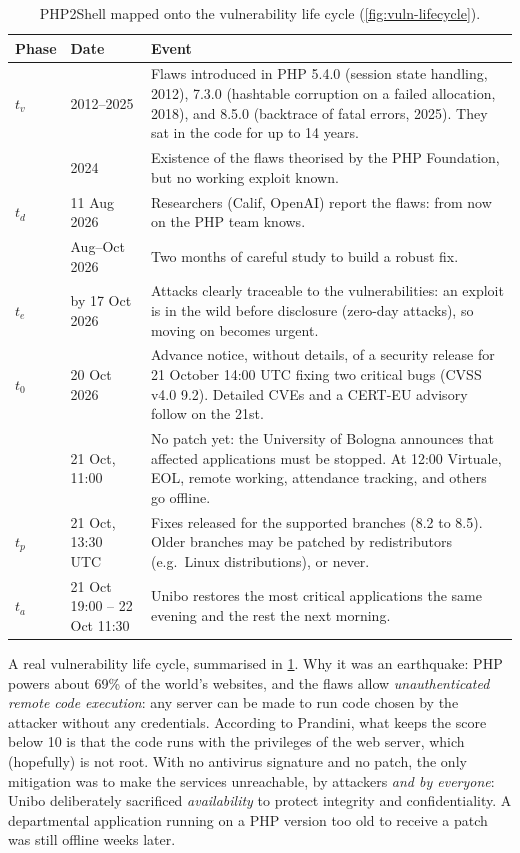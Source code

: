 \begin{table}[htbp]
\centering
\caption{PHP2Shell mapped onto the vulnerability life cycle (\cref{fig:vuln-lifecycle}).}
\label{tab:php2shell}
\begin{tabularx}{\textwidth}{@{}l l X@{}}
\toprule
Phase & Date & Event \\
\midrule
$t_v$ & 2012--2025 & Flaws introduced in PHP 5.4.0 (session state handling, 2012), 7.3.0 (hashtable corruption on a failed allocation, 2018), and 8.5.0 (backtrace of fatal errors, 2025). They sat in the code for up to 14 years. \\
 & 2024 & Existence of the flaws theorised by the PHP Foundation, but no working exploit known. \\
$t_d$ & 11 Aug 2026 & Researchers (Calif, OpenAI) report the flaws: from now on the PHP team knows. \\
 & Aug--Oct 2026 & Two months of careful study to build a robust fix. \\
$t_e$ & by 17 Oct 2026 & Attacks clearly traceable to the vulnerabilities: an exploit is in the wild before disclosure (zero-day attacks), so moving on becomes urgent. \\
$t_0$ & 20 Oct 2026 & Advance notice, without details, of a security release for 21 October 14:00 UTC fixing two critical bugs (CVSS v4.0 9.2). Detailed CVEs and a CERT-EU advisory follow on the 21st. \\
 & 21 Oct, 11:00 & No patch yet: the University of Bologna announces that affected applications must be stopped. At 12:00 Virtuale, EOL, remote working, attendance tracking, and others go offline. \\
$t_p$ & 21 Oct, 13:30 UTC & Fixes released for the supported branches (8.2 to 8.5). Older branches may be patched by redistributors (e.g.\ Linux distributions), or never. \\
$t_a$ & 21 Oct 19:00 -- 22 Oct 11:30 & Unibo restores the most critical applications the same evening and the rest the next morning. \\
\bottomrule
\end{tabularx}
\end{table}

\begin{example}
A real vulnerability life cycle, summarised in \cref{tab:php2shell}.
Why it was an earthquake: PHP powers about 69\% of the world's websites, and the flaws allow \emph{unauthenticated remote code execution}: any server can be made to run code chosen by the attacker without any credentials. According to Prandini, what keeps the score below 10 is that the code runs with the privileges of the web server, which (hopefully) is not root. With no antivirus signature and no patch, the only mitigation was to make the services unreachable, by attackers \emph{and by everyone}: Unibo deliberately sacrificed \emph{availability} to protect integrity and confidentiality. A departmental application running on a PHP version too old to receive a patch was still offline weeks later.
\end{example}

